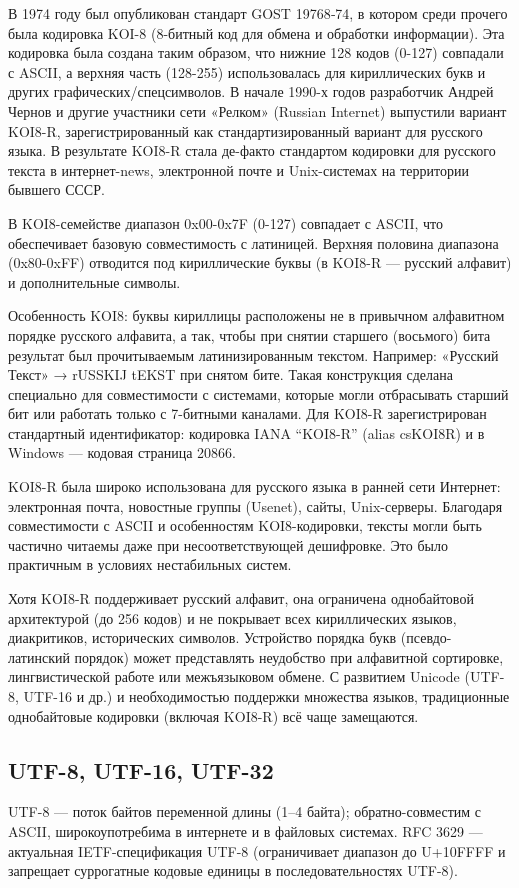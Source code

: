 \documentclass{ou}
\begin{document}
В 1974 году был опубликован стандарт GOST 19768‑74, в котором среди прочего была кодировка KOI-8 (8-битный код для обмена и обработки информации). Эта кодировка была создана таким образом, что нижние 128 кодов (0-127) совпадали с ASCII, а верхняя часть (128-255) использовалась для кириллических букв и других графических/спецсимволов. В начале 1990-х годов разработчик Андрей Чернов и другие участники сети «Релком» (Russian Internet) выпустили вариант KOI8-R, зарегистрированный как стандартизированный вариант для русского языка. В результате KOI8-R стала де-факто стандартом кодировки для русского текста в интернет-news, электронной почте и Unix-системах на территории бывшего СССР. 

В KOI8-семействе диапазон 0x00-0x7F (0-127) совпадает с ASCII, что обеспечивает базовую совместимость с латиницей. Верхняя половина диапазона (0x80-0xFF) отводится под кириллические буквы (в KOI8-R — русский алфавит) и дополнительные символы. 

Особенность KOI8: буквы кириллицы расположены не в привычном алфавитном порядке русского алфавита, а так, чтобы при снятии старшего (восьмого) бита результат был прочитываемым латинизированным текстом. Например: «Русский Текст» → rUSSKIJ tEKST при снятом бите. Такая конструкция сделана специально для совместимости с системами, которые могли отбрасывать старший бит или работать только с 7-битными каналами. Для KOI8-R зарегистрирован стандартный идентификатор: кодировка IANA “KOI8-R” (alias csKOI8R) и в Windows — кодовая страница 20866. 

KOI8-R была широко использована для русского языка в ранней сети Интернет: электронная почта, новостные группы (Usenet), сайты, Unix-серверы. Благодаря совместимости с ASCII и особенностям KOI8-кодировки, тексты могли быть частично читаемы даже при несоответствующей дешифровке. Это было практичным в условиях нестабильных систем. 

Хотя KOI8-R поддерживает русский алфавит, она ограничена однобайтовой архитектурой (до 256 кодов) и не покрывает всех кириллических языков, диакритиков, исторических символов. Устройство порядка букв (псевдо-латинский порядок) может представлять неудобство при алфавитной сортировке, лингвистической работе или межъязыковом обмене. С развитием Unicode (UTF-8, UTF-16 и др.) и необходимостью поддержки множества языков, традиционные однобайтовые кодировки (включая KOI8-R) всё чаще замещаются.
\newpage
\subsection{UTF-8, UTF-16, UTF-32}
UTF-8 — поток байтов переменной длины (1--4 байта); обратно-совместим с ASCII, широкоупотребима в интернете и в файловых системах. RFC 3629 — актуальная IETF-спецификация UTF-8 (ограничивает диапазон до U+10FFFF и запрещает суррогатные кодовые единицы в последовательностях UTF-8). 
\end{document}
